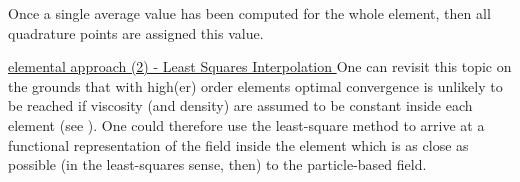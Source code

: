 

Once a single average value has been computed for the whole element, then 
all quadrature points are assigned this value. 


\underline{elemental approach (2) - Least Squares Interpolation } 
One can revisit this topic on the grounds that 
with high(er) order elements optimal convergence is unlikely to be reached 
if viscosity (and density) are assumed to be constant inside each element (see  
\cite{galb19}). One could therefore use the least-square method to arrive at 
a functional representation of the field inside the element which is as 
close as possible (in the least-squares sense, then) to the particle-based field. 

